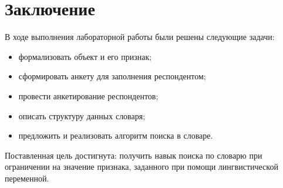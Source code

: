 \chapter*{Заключение}

В ходе выполнения лабораторной работы были решены следующие задачи:

\begin{itemize}[label=---]
	\item формализовать объект и его признак;
	\item сформировать анкету для заполнения респондентом;
	\item провести анкетирование респондентов;
	\item описать структуру данных словаря;
	\item предложить и реализовать алгоритм поиска в словаре.
\end{itemize}

Поставленная цель достигнута: получить навык поиска по словарю при ограничении на значение признака, заданного при помощи лингвистической переменной.
